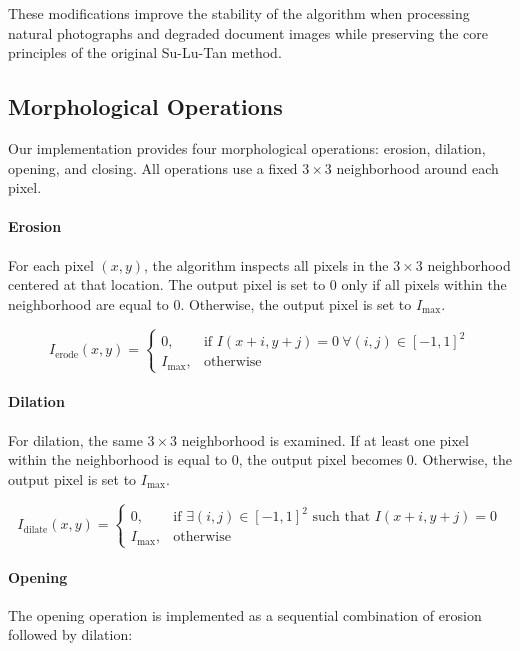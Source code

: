 These modifications improve the stability of the algorithm when
processing natural photographs and degraded document images while
preserving the core principles of the original Su-Lu-Tan method.

\subsection{Morphological Operations}

Our implementation provides four morphological operations:
erosion, dilation, opening, and closing. All operations use a
fixed $3 \times 3$ neighborhood around each pixel.

\paragraph{Erosion}

For each pixel $(x,y)$, the algorithm inspects all pixels in the
$3 \times 3$ neighborhood centered at that location. The output pixel
is set to $0$ only if all pixels within the neighborhood are equal to
$0$. Otherwise, the output pixel is set to $I_{\text{max}}$.

\[
I_{\text{erode}}(x,y) =
\begin{cases}
0, & \text{if } I(x+i,y+j) = 0 \ \forall (i,j) \in [-1,1]^2 \\
I_{\text{max}}, & \text{otherwise}
\end{cases}
\]

\paragraph{Dilation}

For dilation, the same $3 \times 3$ neighborhood is examined.
If at least one pixel within the neighborhood is equal to $0$,
the output pixel becomes $0$. Otherwise, the output pixel is set
to $I_{\text{max}}$.

\[
I_{\text{dilate}}(x,y) =
\begin{cases}
0, & \text{if } \exists (i,j) \in [-1,1]^2 \text{ such that } I(x+i,y+j) = 0 \\
I_{\text{max}}, & \text{otherwise}
\end{cases}
\]

\paragraph{Opening}

The opening operation is implemented as a sequential combination of
erosion followed by dilation:

